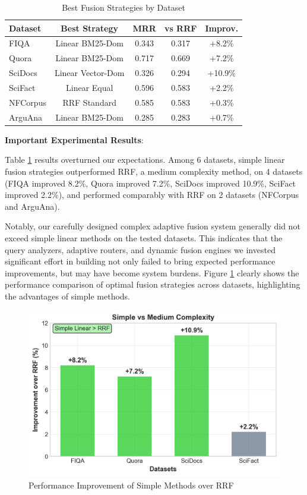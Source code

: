 \documentclass[letterpaper]{article} %
\begin{document}
\begin{table}[t]
\centering
\caption{Best Fusion Strategies by Dataset}
\label{tab:best_strategies}
\scriptsize
\begin{tabular}{lcccc}
\toprule
Dataset & Best Strategy & MRR & vs RRF & Improv. \\
\midrule
FIQA & Linear BM25-Dom & 0.343 & 0.317 & +8.2\% \\
Quora & Linear BM25-Dom & 0.717 & 0.669 & +7.2\% \\
SciDocs & Linear Vector-Dom & 0.326 & 0.294 & +10.9\% \\
SciFact & Linear Equal & 0.596 & 0.583 & +2.2\% \\
NFCorpus & RRF Standard & 0.585 & 0.583 & +0.3\% \\
ArguAna & Linear BM25-Dom & 0.285 & 0.283 & +0.7\% \\
\bottomrule
\end{tabular}
\end{table}

\textbf{Important Experimental Results}:

Table \ref{tab:best_strategies} results overturned our expectations. Among 6 datasets, simple linear fusion strategies outperformed RRF, a medium complexity method, on 4 datasets (FIQA improved 8.2\%, Quora improved 7.2\%, SciDocs improved 10.9\%, SciFact improved 2.2\%), and performed comparably with RRF on 2 datasets (NFCorpus and ArguAna).

Notably, our carefully designed complex adaptive fusion system generally did not exceed simple linear methods on the tested datasets. This indicates that the query analyzers, adaptive routers, and dynamic fusion engines we invested significant effort in building not only failed to bring expected performance improvements, but may have become system burdens. Figure \ref{fig:fusion_strategies} clearly shows the performance comparison of optimal fusion strategies across datasets, highlighting the advantages of simple methods.

\begin{figure}[t]
\centering
\includegraphics[width=0.8\columnwidth]{charts/fusion_strategy_comparison.png}
\caption{Performance Improvement of Simple Methods over RRF}
\label{fig:fusion_strategies}
\end{figure}
\end{document}
